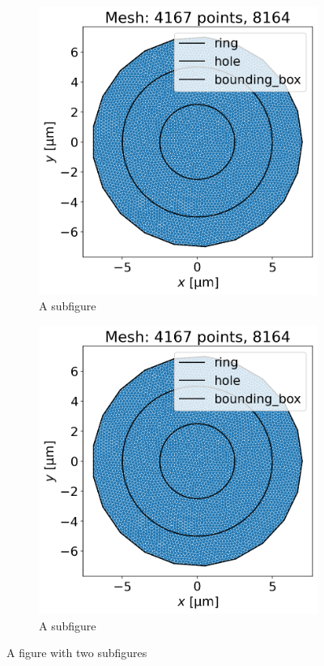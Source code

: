 \documentclass[preprint,12pt]{elsarticle}
\begin{document}
\begin{figure}
\centering
\begin{subfigure}{.45\textwidth}
  \centering
  \includegraphics[width=\linewidth]{examples/images/ring/ring_mesh.png}
  \caption{A subfigure}
  \label{fig:circular_ring_mesh}
\end{subfigure}%
\begin{subfigure}{.45\textwidth}
  \centering
  \includegraphics[width=\linewidth]{examples/images/ring/ring_mesh.png}
  \caption{A subfigure}
  \label{fig:square_ring_mesh}
\end{subfigure}
\caption{A figure with two subfigures}
\label{fig:ring_mesh}
\end{figure}
\end{document}
